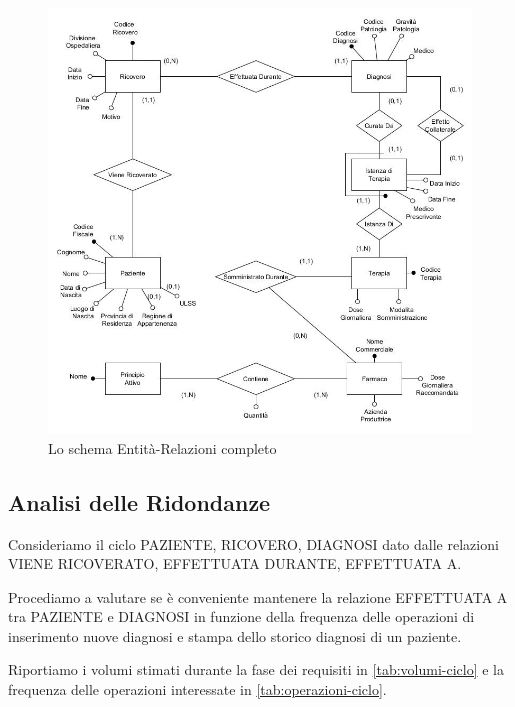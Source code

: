 \documentclass{article}
\begin{document}
\begin{figure}[!ht] %
  \centering
  \includegraphics[width=\linewidth]{schema2.jpg}
  \caption{Lo schema Entità-Relazioni completo}
  \label{schema_ER_ristrutturato}
\end{figure}


\subsection{Analisi delle Ridondanze}
Consideriamo il ciclo PAZIENTE, RICOVERO, DIAGNOSI dato dalle relazioni VIENE RICOVERATO, EFFETTUATA DURANTE, EFFETTUATA A.


Procediamo a valutare se è conveniente mantenere la relazione EFFETTUATA A tra PAZIENTE e DIAGNOSI in funzione della frequenza delle operazioni di inserimento nuove diagnosi e stampa dello storico diagnosi di un paziente.


Riportiamo i volumi stimati durante la fase dei requisiti in \autoref{tab:volumi-ciclo} e la frequenza delle operazioni interessate in \autoref{tab:operazioni-ciclo}.
\end{document}

